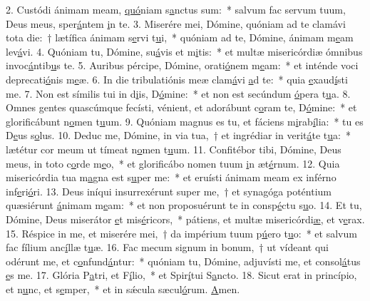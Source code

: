 2. Custódi ánimam meam, \uline{quó}niam s\uline{a}nctus sum:~* salvum fac servum tuum, Deus meus, sper\uline{á}ntem \uline{i}n te.
3. Miserére mei, Dómine, quóniam ad te clamávi tota die:~† lætífica ánimam s\uline{e}rvi t\uline{u}i,~* quóniam ad te, Dómine, ánimam m\uline{e}am lev\uline{á}vi.
4. Quóniam tu, Dómine, su\uline{á}vis et m\uline{i}tis:~* et multæ misericórdiæ ómnibus invoc\uline{á}ntib\uline{u}s te.
5. Auribus pércipe, Dómine, orati\uline{ó}nem m\uline{e}am:~* et inténde voci deprecati\uline{ó}nis m\uline{e}æ.
6. In die tribulatiónis meæ clam\uline{á}vi \uline{a}d te:~* quia \uline{e}xaud\uline{í}sti me.
7. Non est símilis tui in d\uline{i}is, D\uline{ó}mine:~* et non est secúndum \uline{ó}pera t\uline{u}a.
8. Omnes gentes quascúmque fecísti, vénient, et adorábunt c\uline{o}ram te, D\uline{ó}mine:~* et glorificábunt n\uline{o}men t\uline{u}um.
9. Quóniam magnus es tu, et fáciens m\uline{i}rab\uline{í}lia:~* tu es D\uline{e}us s\uline{o}lus.
10. Deduc me, Dómine, in via tua,~† et ingrédiar in verit\uline{á}te t\uline{u}a:~* lætétur cor meum ut tímeat n\uline{o}men t\uline{u}um.
11. Confitébor tibi, Dómine, Deus meus, in toto c\uline{o}rde m\uline{e}o,~* et glorificábo nomen tuum \uline{i}n æt\uline{é}rnum.
12. Quia misericórdia tua m\uline{a}gna est s\uline{u}per me:~* et eruísti ánimam meam ex inférno inf\uline{e}ri\uline{ó}ri.
13. Deus iníqui insurrexérunt super me,~† et synagóga poténtium quæsiérunt \uline{á}nimam m\uline{e}am:~* et non proposuérunt te in consp\uline{é}ctu s\uline{u}o.
14. Et tu, Dómine, Deus miserátor \uline{e}t mis\uline{é}ricors,~* pátiens, et multæ misericórdi\uline{æ}, et v\uline{e}rax.
15. Réspice in me, et miserére mei,~† da impérium tuum p\uline{ú}ero t\uline{u}o:~* et salvum fac fílium anc\uline{í}llæ t\uline{u}æ.
16. Fac mecum signum in bonum,~† ut vídeant qui odérunt me, et c\uline{o}nfund\uline{á}ntur:~* quóniam tu, Dómine, adjuvísti me, et consol\uline{á}tus \uline{e}s me.
17. Glória P\uline{a}tri, et F\uline{í}lio,~* et Spir\uline{í}tui S\uline{a}ncto.
18. Sicut erat in princípio, et n\uline{u}nc, et s\uline{e}mper,~* et in sǽcula sæcul\uline{ó}rum. \uline{A}men.
